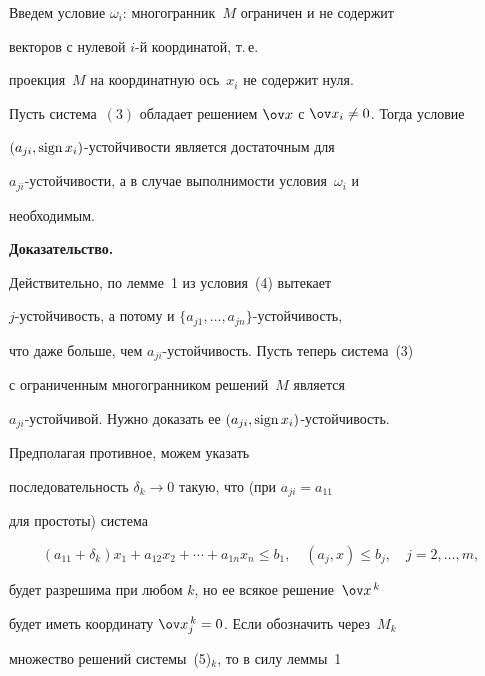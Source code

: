 Введем условие $\omega_i$: многогранник~$M$ ограничен и не содержит


векторов с нулевой $i$-й координатой, т.\,е.


проекция~$M$ на координатную ось~$x_i$ не содержит нуля.





\begin{lem}


Пусть система~$(3)$ обладает решением $\ov x$ с $\ov


x_i\neq 0$. Тогда условие


$(a_{ji},\operatorname{sign} x_i)$-устойчивости является достаточным для


$a_{ji}$-устойчивости, а в случае выполнимости условия~$\omega_i$ и


необходимым.


\end{lem}





{\bf Доказательство.}


Действительно, по лемме~1 из условия~(4) вытекает


$j$-устойчивость, а потому и $\{a_{j1},\dotsc,a_{jn}\}$-устойчивость,


что даже больше, чем $a_{ji}$-устойчивость. Пусть теперь система~(3)


с ограниченным многогранником решений~$M$ является


$a_{ji}$-устойчивой. Нужно доказать ее $(a_{ji},\operatorname{sign} x_i)$-устойчивость.


Предполагая противное, можем указать


последовательность $\delta_k\to 0$ такую, что (при $a_{ji}=a_{11}$


для простоты) система


\begin{equation}


(a_{11}+\delta_k)x_1+a_{12}x_2+\dotsb+a_{1n}x_n\leq b_1,\quad


(a_j,x)\leq b_j,\quad j=2,\dotsc,m,


\tag*{$(5)_k$}


\end{equation}


будет разрешима при любом $k$, но ее всякое решение~$\ov x^{\,k}$


будет иметь координату $\ov x_j^{\,k}=0$. Если обозначить через~$M_k$


множество решений системы~(5)$_k$, то в силу леммы~1


